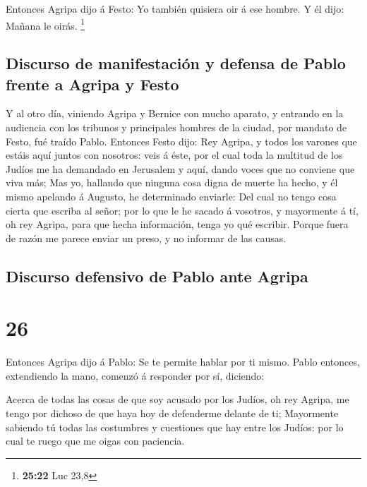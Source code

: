  Entonces Agripa dijo á Festo: Yo también quisiera oir á
ese hombre. Y él dijo: Mañana le oirás. \footnote{\textbf{25:22} Luc
  23,8}

\hypertarget{discurso-de-manifestaciuxf3n-y-defensa-de-pablo-frente-a-agripa-y-festo}{%
\subsection{Discurso de manifestación y defensa de Pablo frente a Agripa
y
Festo}\label{discurso-de-manifestaciuxf3n-y-defensa-de-pablo-frente-a-agripa-y-festo}}

 Y al otro día, viniendo Agripa y Bernice con mucho
aparato, y entrando en la audiencia con los tribunos y principales
hombres de la ciudad, por mandato de Festo, fué traído Pablo.
 Entonces Festo dijo: Rey Agripa, y todos los varones que
estáis aquí juntos con nosotros: veis á éste, por el cual toda la
multitud de los Judíos me ha demandado en Jerusalem y aquí, dando voces
que no conviene que viva más;  Mas yo, hallando que ninguna
cosa digna de muerte ha hecho, y él mismo apelando á Augusto, he
determinado enviarle:  Del cual no tengo cosa cierta que
escriba al señor; por lo que le he sacado á vosotros, y mayormente á tí,
oh rey Agripa, para que hecha información, tenga yo qué escribir.
 Porque fuera de razón me parece enviar un preso, y no
informar de las causas.

\hypertarget{discurso-defensivo-de-pablo-ante-agripa}{%
\subsection{Discurso defensivo de Pablo ante
Agripa}\label{discurso-defensivo-de-pablo-ante-agripa}}

\hypertarget{section-25}{%
\section{26}\label{section-25}}

 Entonces Agripa dijo á Pablo: Se te permite hablar por ti
mismo. Pablo entonces, extendiendo la mano, comenzó á responder por sí,
diciendo:

 Acerca de todas las cosas de que soy acusado por los
Judíos, oh rey Agripa, me tengo por dichoso de que haya hoy de
defenderme delante de ti;  Mayormente sabiendo tú todas las
costumbres y cuestiones que hay entre los Judíos: por lo cual te ruego
que me oigas con paciencia.

